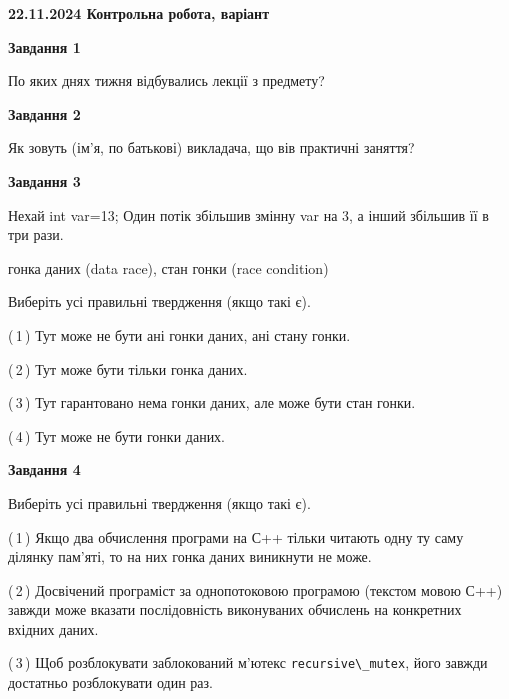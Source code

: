 \documentclass[12pt, ukrainian]{article}
\def\code#1{\Verb!#1!}
\begin{document}
\begin {large}

\textbf{22.11.2024 Контрольна робота, варіант  }\par


{

\begin{center}
\textbf{Завдання 1}
\end{center}

По яких днях тижня відбувались лекції з предмету?


\begin{center}
\textbf{Завдання 2}
\end{center}

Як зовуть (ім'я, по батькові) викладача, що вів практичні заняття?


\begin{center}
\textbf{Завдання 3}
\end{center}

Нехай int var=13; Один потік збільшив змінну var на 3, а інший збільшив її в три рази.

гонка даних (data race), стан гонки (race condition)

Виберіть усі правильні твердження (якщо такі є).\par
\vspace{2mm}
(\,1\,) Тут може не бути ані гонки даних, ані стану гонки.%

(\,2\,) Тут може бути тільки гонка даних.%

(\,3\,) Тут гарантовано нема гонки даних, але може бути стан гонки.%

(\,4\,) Тут може не бути гонки даних.%


\begin{center}
\textbf{Завдання 4}
\end{center}

Виберіть усі правильні твердження (якщо такі є).\par
\vspace{2mm}

(\,1\,) Якщо два обчислення програми на С++ тільки читають одну ту саму ділянку пам'яті, то на них гонка даних  виникнути не може.%

(\,2\,) Досвічений програміст за однопотоковою програмою (текстом мовою С++) завжди може вказати послідовність виконуваних обчислень на конкретних вхідних даних.%

(\,3\,) Щоб розблокувати заблокований м’ютекс \code{recursive\_mutex}, його завжди достатньо розблокувати один раз.%

}
\end{large}
\end{document}
